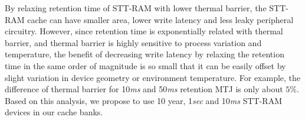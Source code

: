 By relaxing retention time of STT-RAM with lower thermal barrier, the STT-RAM cache can have smaller
area, lower write latency and less leaky peripheral circuitry. However, since retention time is
exponentially related with thermal barrier, and thermal barrier is highly sensitive to process
variation and temperature, the benefit of decreasing write latency by relaxing the retention time in
the same order of magnitude is so small that it can be easily offset by slight variation in device
geometry or environment temperature. For example, the difference of thermal barrier for 10{\it ms} and
50{\it ms} retention MTJ is only about $5\%$.
Based on this analysis, we propose to use 10 year, 1{\it sec} and 10{\it ms} STT-RAM devices in our
cache banks.
